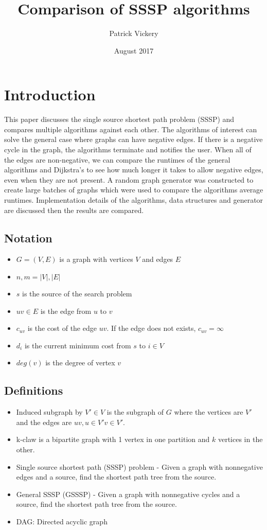 \documentclass{article}
\title{Comparison of SSSP algorithms}
\author{Patrick Vickery }
\date{August 2017}
\begin{document}
\maketitle

\section{Introduction}
This paper discusses the single source shortest path problem (SSSP) and compares multiple algorithms against each other. The algorithms of interest can solve the general case where graphs can have negative edges. If there is a negative cycle in the graph, the algorithms terminate and notifies the user. When all of the edges are non-negative, we can compare the runtimes of the general algorithms and Dijkstra's to see how much longer it takes to allow negative edges, even when they are not present. A random graph generator was constructed to create large batches of graphs which were used to compare the algorithms average runtimes. Implementation details of the algorithms, data structures and generator are discussed then the results are compared.

\subsection{Notation}
\begin{itemize}
\item $G=(V,E)$ is a graph with vertices $V$ and edges $E$
\item $n,m = \lvert V \rvert, \lvert E \rvert$
\item $s$ is the source of the search problem
\item $uv\in E$ is the edge from $u$ to $v$
\item $c_{uv}$ is the cost of the edge $uv$. If the edge does not exists, $c_{uv}= \infty$
\item $d_i$ is the current minimum cost from $s$ to $i \in V$
\item $deg(v)$ is the degree of vertex $v$
\end{itemize}

\subsection{Definitions}
\begin{itemize}
\item Induced subgraph by $V' \in V$ is the subgraph of $G$ where the vertices are $V'$ and the edges are $uv, u\in V' v\in V'$.
\item k-claw is a bipartite graph with 1 vertex in one partition and $k$ vertices in the other.
\item Single source shortest path (SSSP) problem - Given a graph with nonnegative edges and a source, find the shortest path tree from the source.
\item General SSSP (GSSSP) - Given a graph with nonnegative cycles and a source, find the shortest path tree from the source.
\item DAG: Directed acyclic graph
\end{itemize}
\end{document}
